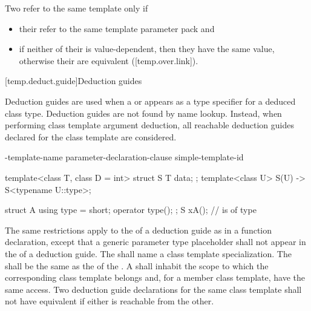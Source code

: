 \documentclass{wg21}
\begin{document}
\begin{addedblock}

Two  refer to the same template only if
\begin{itemize}
    \item their  refer to the same template parameter pack and
    \item if neither of their  is value-dependent, then they have the same value, otherwise their  are equivalent ([temp.over.link]).
\end{itemize}

\end{addedblock}

[temp.deduct.guide]{Deduction guides}
%

\pnum
Deduction guides are used
when a  or 
appears as a type specifier
for a deduced class type.
Deduction guides are not found by name lookup.
Instead, when performing class template argument deduction,
all reachable deduction guides declared for the class template are considered.

\begin{bnf}
	\br
	 -template-name \terminal{(} parameter-declaration-clause \terminal{)} \terminal{->} simple-template-id  \terminal{;}
\end{bnf}

\pnum
\begin{example}
	\begin{codeblock}
		template<class T, class D = int>
		struct S {
			T data;
		};
		template<class U>
		S(U) -> S<typename U::type>;
		
		struct A {
			using type = short;
			operator type();
		};
		S x{A()};           //  is of type 
	\end{codeblock}
\end{example}

\pnum
The same restrictions apply
to the 
of a deduction guide
as in a function declaration,
except that a generic parameter type placeholder
shall not appear in the  of
a deduction guide.
The 
shall name a class template specialization.
The 
shall be the same 
as the 
of the .
A 
shall inhabit the scope
to which the corresponding class template belongs
and, for a member class template, have the same access.
Two deduction guide declarations
for the same class template
shall not have equivalent 
if either is reachable from the other.
\end{document}
